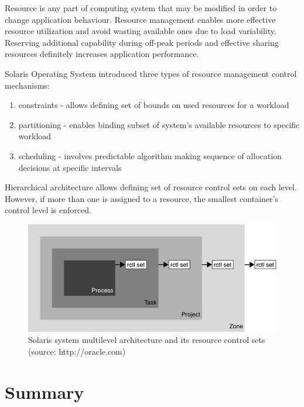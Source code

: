 \documentclass[11pt]{book}
\begin{document}
      Resource is any part of computing system that may be modified in order to change application behaviour. Resource
      management enables more effective resource utilization and avoid wasting available ones due to load variability.
      Reserving additional capability during off-peak periods and effective sharing resources definitely increases
      application performance.
      
      Solaris Operating System introduced three types of resource management control mechanisms:

      \begin{enumerate}
        \item constraints - allows defining set of bounds on used resources for a workload
        \item partitioning - enables binding subset of system's available resources to specific workload
        \item scheduling - involves predictable algorithm making sequence of allocation decisions at specific intervals
      \end{enumerate}

      Hierarchical architecture allows defining set of resource control sets on each level. However, if more
      than one is assigned to a resource, the smallest container's control level is enforced. 

      \begin{figure}[H]
        \includegraphics[width=\textwidth]{img/rctrl.png}
        \caption{Solaris system multilevel architecture and its resource control sets (source: http://oracle.com)}
		  \end{figure}
                

    \section*{Summary}
\end{document}

